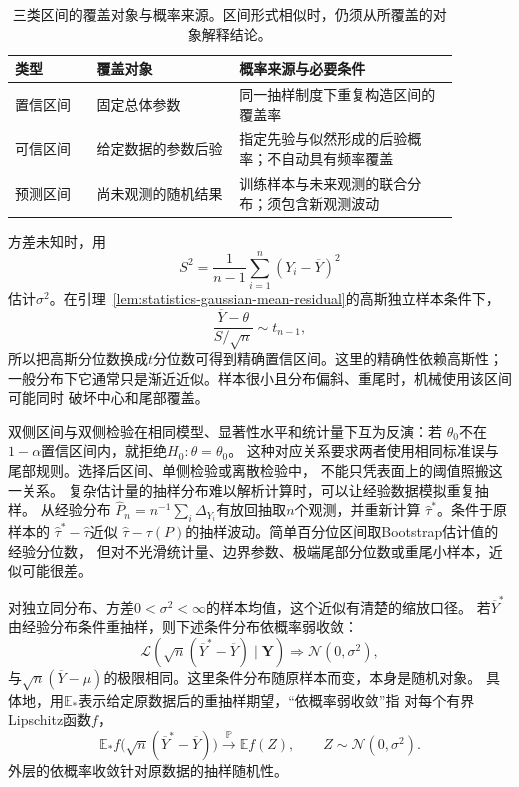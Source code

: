 \begin{table}[htbp]
  \centering
  \begin{tabular}{p{0.16\linewidth}p{0.29\linewidth}p{0.43\linewidth}}
    \toprule
    类型 & 覆盖对象 & 概率来源与必要条件\\
    \midrule
    置信区间 & 固定总体参数 & 同一抽样制度下重复构造区间的覆盖率\\
    可信区间 & 给定数据的参数后验 & 指定先验与似然形成的后验概率；不自动具有频率覆盖\\
    预测区间 & 尚未观测的随机结果 & 训练样本与未来观测的联合分布；须包含新观测波动\\
    \bottomrule
  \end{tabular}
  \caption{三类区间的覆盖对象与概率来源。区间形式相似时，仍须从所覆盖的对象解释结论。}
  \label{tab:statistics-interval-objects}
\end{table}

方差未知时，用
\[
  S^2=\frac1{n-1}\sum_{i=1}^n(Y_i-\overline Y)^2
\]
估计\(\sigma^2\)。在引理~\ref{lem:statistics-gaussian-mean-residual}的高斯独立样本条件下，
\[
  \frac{\overline Y-\theta}{S/\sqrt n}\sim t_{n-1},
\]
所以把高斯分位数换成\(t\)分位数可得到精确置信区间。这里的精确性依赖高斯性；
一般分布下它通常只是渐近近似。样本很小且分布偏斜、重尾时，机械使用该区间可能同时
破坏中心和尾部覆盖。

双侧区间与双侧检验在相同模型、显著性水平和统计量下互为反演：若
\(\theta_0\)不在\(1-\alpha\)置信区间内，就拒绝\(H_0:\theta=\theta_0\)。
这种对应关系要求两者使用相同标准误与尾部规则。选择后区间、单侧检验或离散检验中，
不能只凭表面上的阈值照搬这一关系。
复杂估计量的抽样分布难以解析计算时，可以让经验数据模拟重复抽样。
从经验分布
\(\widehat P_n=n^{-1}\sum_i\Delta_{Y_i}\)有放回抽取\(n\)个观测，并重新计算
\(\widehat\tau^\ast\)。条件于原样本的
\(\widehat\tau^\ast-\widehat\tau\)近似
\(\widehat\tau-\tau(P)\)的抽样波动。简单百分位区间取Bootstrap估计值的经验分位数，
但对不光滑统计量、边界参数、极端尾部分位数或重尾小样本，近似可能很差。

对独立同分布、方差\(0<\sigma^2<\infty\)的样本均值，这个近似有清楚的缩放口径。
若\(\overline Y^\ast\)由经验分布条件重抽样，则下述条件分布依概率弱收敛：
\[
  \mathcal L\!\left(
    \sqrt n(\overline Y^\ast-\overline Y)\mid\bm Y
  \right)
  \Longrightarrow\mathcal N(0,\sigma^2),
\]
与\(\sqrt n(\overline Y-\mu)\)的极限相同。这里条件分布随原样本而变，本身是随机对象。
具体地，用\(\mathbb E_\ast\)表示给定原数据后的重抽样期望，“依概率弱收敛”指
对每个有界Lipschitz函数\(f\)，
\[
 \mathbb E_\ast f\bigl(\sqrt n(\overline Y^\ast-\overline Y)\bigr)
 \xrightarrow{\mathbb P}\mathbb E f(Z),\qquad Z\sim\mathcal N(0,\sigma^2).
\]
外层的依概率收敛针对原数据的抽样随机性。

